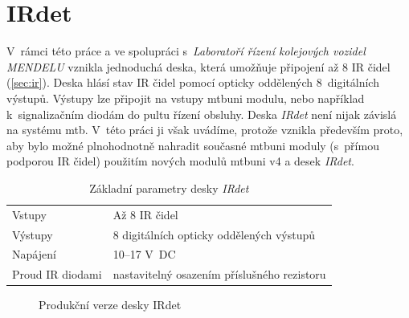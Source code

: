 \newpage
\section{IRdet} \label{sec:irdet}

V~rámci této práce a ve spolupráci s~\textit{Laboratoří řízení kolejových
vozidel MENDELU} vznikla jednoduchá deska, která umožňuje připojení až 8 IR
čidel (\ref{sec:ir}). Deska hlásí stav IR čidel pomocí opticky oddělených
8~digitálních výstupů. Výstupy lze připojit na vstupy \gls{mtbuni}
modulu, nebo například k~signalizačním diodám do pultu řízení obsluhy.
Deska \textit{IRdet} není nijak závislá na systému \gls{mtb}. V~této práci ji
však uvádíme, protože vznikla především proto, aby bylo možné plnohodnotně
nahradit současné \gls{mtbuni} moduly (s~přímou podporou IR čidel) použitím
nových modulů \gls{mtbuni} v4 a desek \textit{IRdet}.

\begin{table}[h]
	\begin{tabularx}{\textwidth}{lX}
		\toprule
		Vstupy & Až 8 IR čidel \\
		Výstupy & 8 digitálních opticky oddělených výstupů \\
		Napájení & 10–17 V~DC \\
		Proud IR diodami & nastavitelný osazením příslušného rezistoru \\
		\bottomrule
	\end{tabularx}
	\caption{Základní parametry desky \textit{IRdet}}
	\label{tab:mtbuni-params}
\end{table}

\begin{figure}[ht!]
\caption{Produkční verze desky IRdet}
\label{fig:irdet}
\end{figure}

